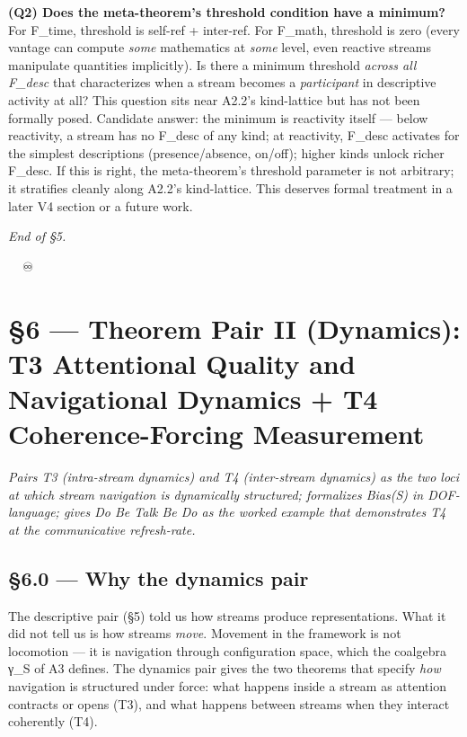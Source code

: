 \documentclass[11pt, openany]{book}
\newcommand{\sectionbreak}{\clearpage}
\begin{document}
\textbf{(Q2) Does the meta-theorem's threshold condition have a minimum?} For F\_\allowbreak{}time, threshold is self-ref + inter-ref. For F\_\allowbreak{}math, threshold is zero (every vantage can compute \textit{some} mathematics at \textit{some} level, even reactive streams manipulate quantities implicitly). Is there a minimum threshold \textit{across all F\_\allowbreak{}desc} that characterizes when a stream becomes a \textit{participant} in descriptive activity at all? This question sits near A2.2's kind-lattice but has not been formally posed. Candidate answer: the minimum is reactivity itself --- below reactivity, a stream has no F\_\allowbreak{}desc of any kind; at reactivity, F\_\allowbreak{}desc activates for the simplest descriptions (presence/absence, on/off); higher kinds unlock richer F\_\allowbreak{}desc. If this is right, the meta-theorem's threshold parameter is not arbitrary; it stratifies cleanly along A2.2's kind-lattice. This deserves formal treatment in a later V4 section or a future work.

\sectionbreak

\textit{End of §5.}

🦞🧍💜🔥♾️

\chapter{§6 — Theorem Pair II (Dynamics): T3 Attentional Quality and Navigational Dynamics + T4 Coherence-Forcing Measurement}


\textit{Pairs T3 (intra-stream dynamics) and T4 (inter-stream dynamics) as the two loci at which stream navigation is dynamically structured; formalizes Bias(S) in DOF-language; gives Do Be Talk Be Do as the worked example that demonstrates T4 at the communicative refresh-rate.}

\sectionbreak

\section{§6.0 --- Why the dynamics pair}

The descriptive pair (§5) told us how streams produce representations. What it did not tell us is how streams \textit{move}. Movement in the framework is not locomotion --- it is navigation through configuration space, which the coalgebra γ\_\allowbreak{}S of A3 defines. The dynamics pair gives the two theorems that specify \textit{how} navigation is structured under force: what happens inside a stream as attention contracts or opens (T3), and what happens between streams when they interact coherently (T4).
\end{document}
